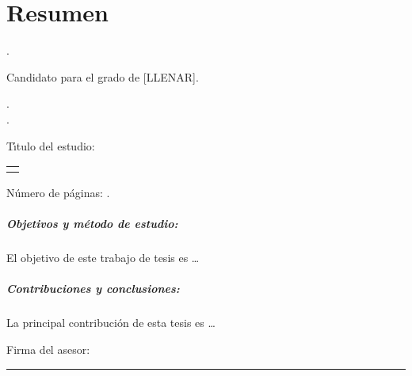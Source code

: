 
\chapter{Resumen}

\noindent\autor.

\noindent Candidato para el grado de [LLENAR].

\noindent\uanl.\\
\noindent\fime.

\noindent T\'{\i}tulo del estudio:

\begin{center}
\begin{tabular}{p{11cm}}
	\centering
	\scshape{\large{\titulo}}
\end{tabular}
\end{center}\bigskip

\noindent N\'{u}mero de p\'{a}ginas: \pageref*{lastpage}.

\paragraph{Objetivos y m\'{e}todo de estudio:}
El objetivo de este trabajo de tesis es \ldots


\paragraph{Contribuciones y conclusiones:}
La principal contribuci\'{o}n de esta tesis es \ldots

\noindent Firma del asesor: \rule{72mm}{0.3pt}

\vspace*{-4mm}

\noindent \phantom{Firma del asesor: m} \asesor

